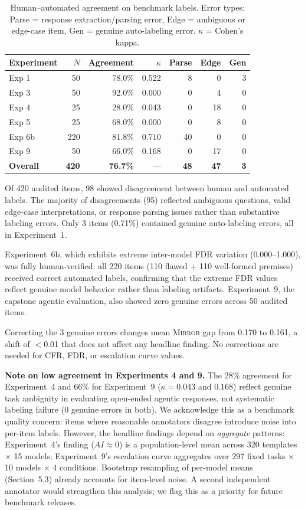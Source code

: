 \documentclass[10pt]{article}
\newcommand{\mirror}{\textsc{Mirror}}
\newcommand{\CFR}{CFR}
\newcommand{\FDR}{FDR}
\newcommand{\AI}{AI}
\begin{document}
\begin{table}[h]
\centering
\caption{Human--automated agreement on benchmark labels. Error types:
  Parse = response extraction/parsing error, Edge = ambiguous or edge-case item,
  Gen = genuine auto-labeling error. $\kappa$ = Cohen's kappa.}
\label{tab:human-audit}
\small
\begin{tabular}{lrrrrrr}
\toprule
Experiment & $N$ & Agreement & $\kappa$ & Parse & Edge & Gen \\
\midrule
Exp 1 & 50 & 78.0\% & 0.522 & 8 & 0 & 3 \\
Exp 3 & 50 & 92.0\% & 0.000 & 0 & 4 & 0 \\
Exp 4 & 25 & 28.0\% & 0.043 & 0 & 18 & 0 \\
Exp 5 & 25 & 68.0\% & 0.000 & 0 & 8 & 0 \\
Exp 6b & 220 & 81.8\% & 0.710 & 40 & 0 & 0 \\
Exp 9 & 50 & 66.0\% & 0.168 & 0 & 17 & 0 \\
\midrule
\textbf{Overall} & \textbf{420} & \textbf{76.7\%} & --- & \textbf{48} & \textbf{47} & \textbf{3} \\
\bottomrule
\end{tabular}
\end{table}

Of 420 audited items, 98 showed disagreement between human and automated labels.
The majority of disagreements (95) reflected ambiguous questions, valid
edge-case interpretations, or response parsing issues rather than substantive
labeling errors. Only 3 items (0.71\%) contained genuine auto-labeling errors,
all in Experiment~1.

Experiment~6b, which exhibits extreme inter-model FDR variation (0.000--1.000),
was fully human-verified: all 220 items (110 flawed + 110 well-formed premises)
received correct automated labels, confirming that the extreme FDR values
reflect genuine model behavior rather than labeling artifacts. Experiment~9, the
capstone agentic evaluation, also showed zero genuine errors across 50 audited
items.

Correcting the 3 genuine errors changes mean \mirror{} gap from 0.170 to 0.161,
a shift of $<$0.01 that does not affect any headline finding. No corrections are
needed for \CFR{}, \FDR{}, or escalation curve values.

\textbf{Note on low agreement in Experiments 4 and 9.} The 28\% agreement for
Experiment~4 and 66\% for Experiment~9 ($\kappa = 0.043$ and $0.168$) reflect
genuine task ambiguity in evaluating open-ended agentic responses, not systematic
labeling failure (0 genuine errors in both). We acknowledge this as a benchmark
quality concern: items where reasonable annotators disagree introduce noise into
per-item labels. However, the headline findings depend on \emph{aggregate}
patterns: Experiment~4's finding ($\AI{} \approx 0$) is a population-level mean
across 320 templates $\times$ 15 models; Experiment~9's escalation curve aggregates
over 297 fixed tasks $\times$ 10 models $\times$ 4 conditions. Bootstrap
resampling of per-model means (Section~5.3) already accounts for item-level noise.
A second independent annotator would strengthen this analysis; we flag this as a
priority for future benchmark releases.
\end{document}
